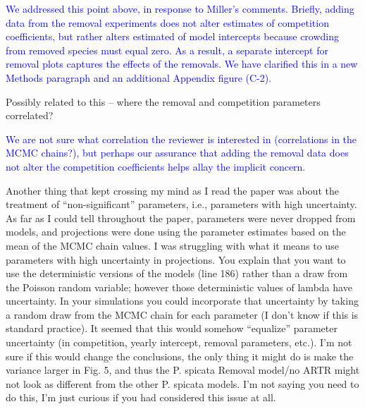 \documentclass[12pt]{article}
\newcommand{\response}{\textcolor{blue}}
\begin{document}
\response{We addressed this point above, in response to Miller's comments. Briefly, adding data from the removal experiments does not alter estimates of competition coefficients, but rather alters estimated of model intercepts because crowding from removed species must equal zero. As a result, a separate intercept for removal plots captures the effects of the removals. We have clarified this in a new Methods paragraph and an additional Appendix figure (C-2).}

Possibly related to this – where the removal and competition parameters correlated?

\response{We are not sure what correlation the reviewer is interested in (correlations in the MCMC chains?), but perhaps our assurance that
adding the removal data does not alter the competition coefficients helps allay the implicit concern.}

Another thing that kept crossing my mind as I read the paper was about the treatment of “non-significant” parameters, i.e., parameters with high uncertainty. As far as I could tell throughout the paper, parameters were never dropped from models, and projections were done using the parameter estimates based on the mean of the MCMC chain values. I was struggling with what it means to use parameters with high uncertainty in projections. You explain that you want to use the deterministic versions of the models (line 186) rather than a draw from the Poisson random variable; however those deterministic values of lambda have uncertainty. In your simulations you could incorporate that uncertainty by taking a random draw from the MCMC chain for each parameter (I don't know if this is standard practice). It seemed that this would somehow “equalize” parameter uncertainty (in competition, yearly intercept, removal parameters, etc.). I'm not sure if this would change the conclusions, the only thing it might do is make the variance larger in Fig. 5, and thus the P. spicata Removal model/no ARTR might not look as different from the other P. spicata models. I'm not saying you need to do this, I'm just curious if you had considered this issue at all.
\end{document}
